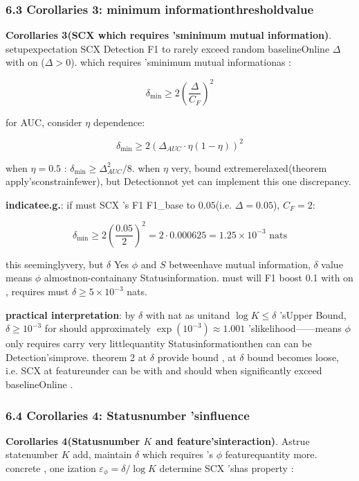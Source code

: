 \documentclass[
  12pt,
]{article}
\begin{document}
\subsubsection{6.3 Corollaries
3: minimum informationthresholdvalue }\label{ux63a8ux8bba-3ux6700ux5c0fux4fe1ux606fux9608ux503c}

\textbf{Corollaries 3(SCX which requires 'sminimum mutual information)}. setupexpectation SCX Detection F1
to rarely exceed random baselineOnline  \(\Delta\) with on (\(\Delta > 0\)). which requires 'sminimum mutual informationas : 

\[\delta_{\min} \geq 2\left(\frac{\Delta}{C_F}\right)^2\]

for  AUC, consider \(\eta\) dependence: 

\[\delta_{\min} \geq 2 \left(\Delta_{AUC} \cdot \eta(1-\eta)\right)^2\]

when  \(\eta = 0.5\) : \(\delta_{\min} \geq \Delta_{AUC}^2 / 8\). when 
\(\eta\)
very, bound extremerelaxed(theorem apply'sconstrainfewer), but Detectionnot yet can implement this one discrepancy. 

\textbf{indicatee.g.}: if must  SCX 's F1  F1\_base to  \(0.05\)(i.e.
\(\Delta = 0.05\)),  \(C_F = 2\): 

\[\delta_{\min} \geq 2\left(\frac{0.05}{2}\right)^2 = 2 \cdot 0.000625 = 1.25 \times 10^{-3} \text{ nats}\]

this seeminglyvery, but  \(\delta\) Yes \(\phi\) and  \(S\)
betweenhave mutual information, \(\delta\) value means  \(\phi\)
almostnon-containany Statusinformation. must will  F1 boost  0.1 with on , requires must 
\(\delta \geq 5 \times 10^{-3}\) nats. 

\textbf{practical interpretation}: by  \(\delta\) with  nat as unitand 
\(\log K \leq \delta\) 'sUpper Bound, \(\delta \geq 10^{-3}\) for should approximately
\(\exp(10^{-3}) \approx 1.001\) 'slikelihood------means  \(\phi\)
only requires carry very littlequantity Statusinformationthen can can be Detection'simprove. theorem  2 at  \(\delta\)
provide bound , at  \(\delta\) bound becomes loose, i.e. SCX
at featureunder can be with and should when significantly exceed baselineOnline . 

\subsubsection{6.4 Corollaries
4: Statusnumber 'sinfluence }\label{ux63a8ux8bba-4ux72b6ux6001ux6570ux7684ux5f71ux54cd}

\textbf{Corollaries 4(Statusnumber  \(K\) and feature'sinteraction)}. Astrue statenumber  \(K\)
add, maintain  \(\delta\) which requires 's \(\phi\)
featurequantity more. concrete , one ization  \(\varepsilon_\phi = \delta / \log K\)
determine SCX 'shas property : 
\end{document}
